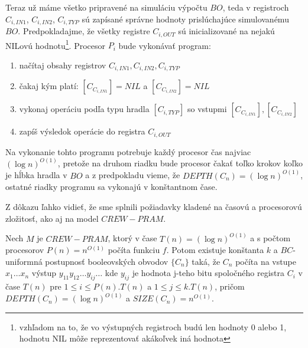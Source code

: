 \begin{dokaz}
\begin{itemize}
    Teraz už máme všetko pripravené na simuláciu výpočtu $BO$, teda
    v registroch  $C_{i,IN1}$, $C_{i,IN2}$, $C_{i,TYP}$ sú zapísané
    správne hodnoty prislúchajúce simulovanému $BO$. Predpo\-kladajme,
    že všetky registre $C_{i,OUT}$ sú inicializované na nejakú
    NILovú hodnotu\footnote{vzhľadom na to, že vo výstupných
    registroch budú len hodnoty 0 alebo 1, hodnotu NIL môže
    reprezentovať akákoľvek iná hodnota}. Procesor $P_i$ bude
    vykonávať program:
    \begin{enumerate}
      \item načítaj obsahy registrov $C_{i,IN1}, C_{i,IN2}, C_{i,TYP}$
      \item čakaj kým platí: $[C_{C_{i,IN1}}] = NIL$ a $[C_{C_{i,IN2}}] = NIL$
      \item vykonaj operáciu podľa typu hradla $[C_{i,TYP}]$ so
      vstupmi $[C_{C_{i,IN1}}], [C_{C_{i,IN2}}]$
      \item zapíš výsledok operácie do registra $C_{i,OUT}$
    \end{enumerate}
    Na vykonanie tohto programu potrebuje každý procesor čas najviac
    $(\log n)^{O(1)}$, pretože na druhom riadku bude procesor čakať
    toľko krokov koľko je hĺbka hradla v $BO$ a z predpokladu vieme, že
    $DEPTH(C_n)=(\log n)^{O(1)}$, ostatné riadky programu sa
    vykonajú v konštantnom čase.
  \end{itemize}

  Z dôkazu ľahko vidieť, že sme splnili požiadavky kladené na časovú
  a procesorovú zložitosť, ako aj na model $CREW-PRAM$.
\end{dokaz}

\begin{veta}
  Nech $M$ je $CREW-PRAM$, ktorý v čase $T(n)={(\log n)}^{O(1)}$ a s
  počtom procesorov $P(n)=n^{O(1)}$ počíta funkciu $f$. Potom
  existuje konštanta $k$ a $BC$-uniformná postupnosť booleovských
  obvodov $\{ C_n\}$ taká, že $C_n$ počíta na vstupe $x_1\dots x_n$
  výstup $y_{11}y_{12}\dots y_{ij}\dots$ kde $y_{ij}$ je hodnota
  j-teho bitu spoločného registra $C_i$ v čase $T(n)$ pre $1\leq
  i\leq P(n).T(n)$ a $1\leq j\leq k.T(n)$, pričom $DEPTH(C_n)={(\log
  n)}^{O(1)}$ a $SIZE(C_n)=n^{O(1)}$.
\end{veta}

